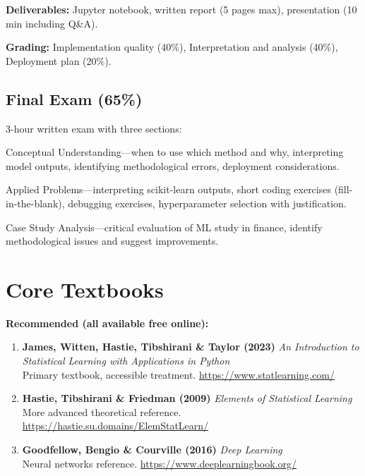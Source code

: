 \documentclass[11pt,a4paper]{article}
\begin{document}
\textbf{Deliverables:} Jupyter notebook, written report (5 pages max), presentation (10 min including Q\&A).

\textbf{Grading:} Implementation quality (40\%), Interpretation and analysis (40\%), Deployment plan (20\%).

\subsection{Final Exam (65\%)}

3-hour written exam with three sections:

\begin{description}[leftmargin=*]
    \item[Section A (30 points):] Conceptual Understanding---when to use which method and why, interpreting model outputs, identifying methodological errors, deployment considerations.
    \item[Section B (20 points):] Applied Problems---interpreting scikit-learn outputs, short coding exercises (fill-in-the-blank), debugging exercises, hyperparameter selection with justification.
    \item[Section C (15 points):] Case Study Analysis---critical evaluation of ML study in finance, identify methodological issues and suggest improvements.
\end{description}

\section{Core Textbooks}

\textbf{Recommended (all available free online):}

\begin{enumerate}[leftmargin=*]
    \item \textbf{James, Witten, Hastie, Tibshirani \& Taylor (2023)} \textit{An Introduction to Statistical Learning with Applications in Python}\\
    Primary textbook, accessible treatment. \url{https://www.statlearning.com/}
    
    \item \textbf{Hastie, Tibshirani \& Friedman (2009)} \textit{Elements of Statistical Learning}\\
    More advanced theoretical reference. \url{https://hastie.su.domains/ElemStatLearn/}
    
    \item \textbf{Goodfellow, Bengio \& Courville (2016)} \textit{Deep Learning}\\
    Neural networks reference. \url{https://www.deeplearningbook.org/}
\end{enumerate}
\end{document}
